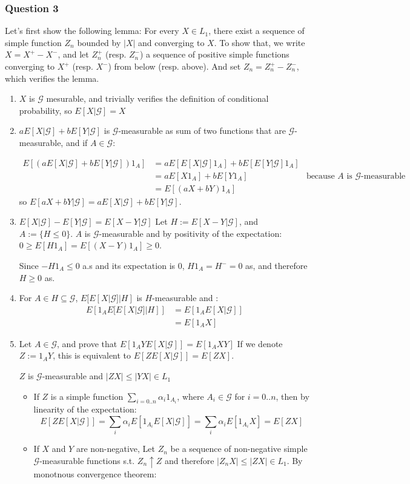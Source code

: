 \documentclass[12pt]{article}
\newcommand{\Q}[1]{\subsubsection*{Question #1}}
\begin{document}
\Q{3}
Let's first show the following lemma:
For every $X \in L_1$, there exist a sequence of simple function $Z_n$ bounded by $|X|$ and converging to $X$.
To show that, we write $X = X^+ - X^-$, and let $Z_n^+$ (resp. $Z_n^-$)  a sequence of positive simple functions converging to $X^+$ (resp. $X^-$) from below (resp. above). And set $Z_n = Z_n^+ - Z_n^-$, which verifies the lemma.


\begin{enumerate}
\item $X$ is $\mathcal G$ mesurable, and trivially verifies the definition of conditional probability, so $E[X|\mathcal G] = X$
\item $aE[X|\mathcal G] + bE[Y|\mathcal G]$ is $\mathcal G$-measurable as sum of two functions that are $\mathcal G$-measurable, and if $A \in \mathcal G$:

\begin{align*}
E[ (aE[X|\mathcal G]+bE[Y|\mathcal G])1_A ] &= a E[E[X|\mathcal G]1_A]+ bE[E[Y|\mathcal G]1_A]
\\&= a E[X 1_A]+ b E[Y 1_A]&\text{because $A$ is $\mathcal G$-measurable}
\\&=  E[(aX +bY) 1_A]
\end{align*}
 so $E[aX+bY|\mathcal G] = aE[X|\mathcal G]+bE[Y|\mathcal G]$.
\item 
$E[X | \mathcal G] - E[Y | \mathcal G] = E[X - Y | \mathcal G]$
Let $H := E[X - Y | \mathcal G]$, and $A := \{H \le 0\}$. $A$ is $\mathcal G$-measurable and by positivity of the expectation: $0 \ge E[H 1_A] = E[(X-Y) 1_A] \ge 0$.

Since $-H1_A \le 0$ a.s and its expectation is 0,  $H1_A = H^- = 0$ as, and therefore $H \ge 0$ as.
\item For $A \in H \subseteq \mathcal G$, $E[E[X|\mathcal G] | H]$ is $H$-measurable and :
\begin{align*}
E\left[1_A E[E[X|\mathcal G] | H]\right] 
&= E[ 1_A E[X|\mathcal G] ] 
\\&= E[ 1_A X ] 
\end{align*}


\item Let $A \in \mathcal G$, and prove that $E[ 1_A Y E[X|\mathcal G] ] = E[1_A XY ]$
If we denote $Z := 1_A Y$, this is equivalent to $E[ Z E[X|\mathcal G] ] = E[ZX ]$.

 $Z$ is $\mathcal G$-measurable and $|ZX| \le |YX| \in L_1$
\begin{itemize}
\item If $Z$ is a simple function $\sum_{i=0..n} \alpha_i 1_{A_i}$, where $A_i \in \mathcal G$ for $i = 0..n$, then by linearity of the expectation:
$$E[ Z E[X|\mathcal G] ] = \sum_i \alpha_i E[1_{A_i} E[X|\mathcal G]] = \sum_i \alpha_i E[1_{A_i} X] = E[ZX]$$
\item If $X$ and $Y$ are non-negative, Let $Z_n$ be a sequence of non-negative simple $\mathcal G$-measurable functions s.t. $Z_n \uparrow Z$ and therefore 
$|Z_nX| \le |ZX| \in L_1$. By monotnous convergence theorem:


\end{itemize}
\end{enumerate}
\end{document}
